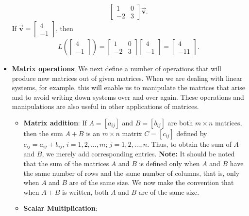 \documentclass{report}
\begin{document}
\begin{itemize}
\begin{align*}
                \begin{bmatrix}
                    1 & 0 \\ -2 & 3
                \end{bmatrix} \vec{\mathbf{v}}
            .\end{align*}
            If $\vec{\mathbf{v}} = \begin{bmatrix} 4 \\ -1\end{bmatrix} $, then
            \begin{align*}
                L\left( \begin{bmatrix} 4 \\ -1 \end{bmatrix}\right) = \begin{bmatrix} 1 & 0 \\ -2 & 3\end{bmatrix} \begin{bmatrix} 4 \\ -1\end{bmatrix} = \begin{bmatrix}4 \\ -11\end{bmatrix}
            .\end{align*}
        \item \textbf{Matrix operations}: We next define a number of operations that will produce new matrices out of given matrices. When we are dealing with linear systems, for example, this will enable us to manipulate the matrices that arise and to avoid writing down systems over and over again. These operations and manipulations are also useful in other applications of matrices.
            \begin{itemize}
                \item \textbf{Matrix addition}: If \( A = [a_{ij}] \) and \( B = [b_{ij}] \) are both \( m \times n \) matrices, then the sum \( A + B \) is an \( m \times n \) matrix \( C = [c_{ij}] \) defined by \( c_{ij} = a_{ij} + b_{ij}, \, i = 1, 2, \ldots, m; \, j = 1, 2, \ldots, n \). Thus, to obtain the sum of \( A \) and \( B \), we merely add corresponding entries.
                    \bigbreak \noindent 
                    \textbf{Note:} It should be noted that the sum of the matrices $A$ and $B$ is defined only when $A$ and $B$ have the same number of rows and the same number of columns, that is, only when $A$ and $B$ are of the same size. We now make the convention that when $A + B$ is written, both $A$ and $B$ are of the same size.
                \item \textbf{Scalar Multiplication}:

\end{itemize}
\end{itemize}
\end{document}
